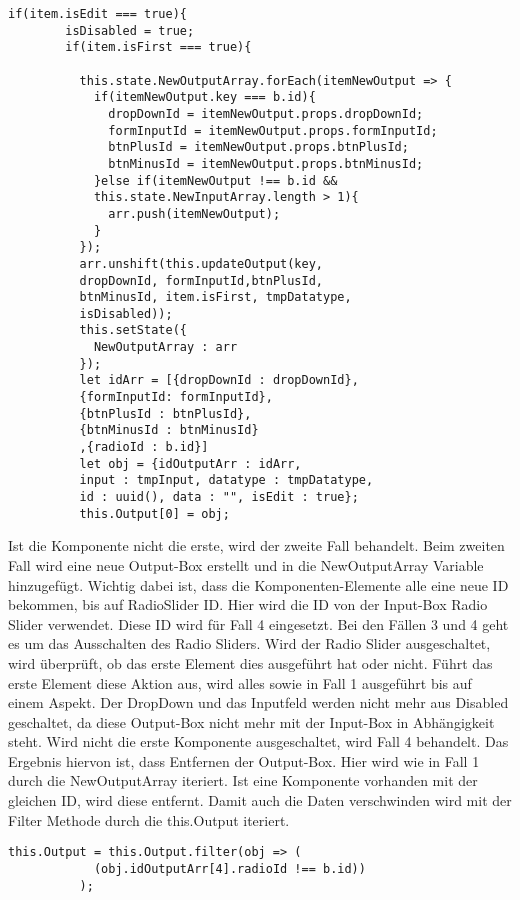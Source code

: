 \documentclass[a4paper,11pt]{scrreprt}
\begin{document}
\begin{lstlisting}
if(item.isEdit === true){
        isDisabled = true;
        if(item.isFirst === true){
          
          this.state.NewOutputArray.forEach(itemNewOutput => {
            if(itemNewOutput.key === b.id){
              dropDownId = itemNewOutput.props.dropDownId;
              formInputId = itemNewOutput.props.formInputId;
              btnPlusId = itemNewOutput.props.btnPlusId;
              btnMinusId = itemNewOutput.props.btnMinusId;
            }else if(itemNewOutput !== b.id &&
            this.state.NewInputArray.length > 1){
              arr.push(itemNewOutput);
            }
          });
          arr.unshift(this.updateOutput(key,
          dropDownId, formInputId,btnPlusId,
          btnMinusId, item.isFirst, tmpDatatype,
          isDisabled));
          this.setState({
            NewOutputArray : arr
          });
          let idArr = [{dropDownId : dropDownId},
          {formInputId: formInputId},
          {btnPlusId : btnPlusId},
          {btnMinusId : btnMinusId}
          ,{radioId : b.id}]
          let obj = {idOutputArr : idArr,
          input : tmpInput, datatype : tmpDatatype,
          id : uuid(), data : "", isEdit : true};
          this.Output[0] = obj;
\end{lstlisting}
Ist die Komponente nicht die erste, wird der zweite Fall behandelt. Beim zweiten Fall wird eine neue Output-Box erstellt und in die NewOutputArray Variable hinzugefügt. Wichtig dabei ist, dass die Komponenten-Elemente alle eine neue ID bekommen, bis auf RadioSlider ID. Hier wird die ID von der Input-Box Radio Slider verwendet. Diese ID wird für Fall 4 eingesetzt. Bei den Fällen 3 und 4 geht es um das Ausschalten des Radio Sliders.
Wird der Radio Slider ausgeschaltet, wird überprüft, ob das erste Element dies ausgeführt hat oder nicht. Führt das erste Element diese Aktion aus, wird alles sowie in Fall 1 ausgeführt bis auf einem Aspekt. Der DropDown und das Inputfeld werden nicht mehr aus Disabled geschaltet, da diese Output-Box nicht mehr mit der Input-Box in Abhängigkeit steht. 
Wird nicht die erste Komponente ausgeschaltet, wird Fall 4 behandelt. Das Ergebnis hiervon ist, dass Entfernen der Output-Box. Hier wird wie in Fall 1 durch die NewOutputArray iteriert. Ist eine Komponente vorhanden mit der gleichen ID, wird diese entfernt. Damit auch die Daten verschwinden wird mit der Filter Methode durch die this.Output iteriert. 
\begin{lstlisting}
this.Output = this.Output.filter(obj => (
            (obj.idOutputArr[4].radioId !== b.id))
          );
\end{lstlisting}
\end{document}
